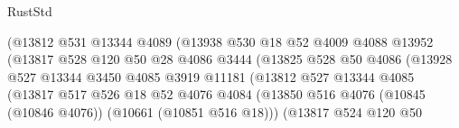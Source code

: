 \begin{lexlean}{RustStd}
\begin{coremodule}
                                      (@13812
                                        @531
                                        @13344
                                        @4089
                                        (@13938
                                          @530
                                          @18
                                          @52
                                          @4009
                                          @4088
                                          @13952
                                          (@13817
                                            @528
                                            @120
                                            @50
                                            @28
                                            @4086
                                            @3444
                                            (@13825
                                              @528
                                              @50
                                              @4086
                                              (@13928
                                                @527
                                                @13344
                                                @3450
                                                @4085
                                                @3919
                                                @11181
                                                (@13812
                                                  @527
                                                  @13344
                                                  @4085
                                                  (@13817
                                                    @517
                                                    @526
                                                    @18
                                                    @52
                                                    @4076
                                                    @4084
                                                    (@13850
                                                      @516
                                                      @4076
                                                      (@10845 (@10846 @4076))
                                                      (@10661 (@10851 @516 @18)))
                                                    (@13817
                                                      @524
                                                      @120
                                                      @50

\end{coremodule}
\end{lexlean}
